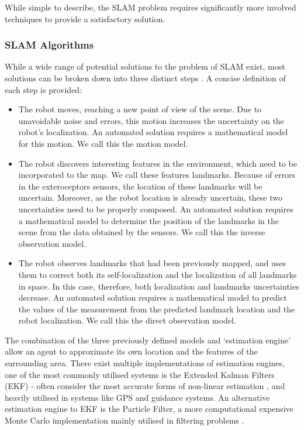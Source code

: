 While simple to describe, the SLAM problem requires significantly more
involved techniques to provide a satisfactory solution.

\subsubsection{SLAM Algorithms}
While a wide range of potential solutions to the problem of SLAM exist, most
solutions can be broken down into three distinct steps \cite{Sola2013}. 
A concise definition of each step is provided:

\begin{itemize}
\item The robot moves, reaching a new point of view of the scene. 
Due to unavoidable noise and errors, this motion increases the uncertainty on
the robot’s localization.
An automated solution requires a mathematical model for this motion. We call
this the motion model.

\item The robot discovers interesting features in the environment, which need
to be incorporated to the map. 
We call these features landmarks. 
Because of errors in the exteroceptors sensors, the location of these
landmarks will be uncertain.
Moreover, as the robot location is already uncertain, these two uncertainties
need to be properly composed. 
An automated solution requires a mathematical model to determine the position
of the landmarks in the scene from the data obtained by the sensors. 
We call this the inverse observation model.

\item The robot observes landmarks that had been previously mapped, and uses
them to correct both its self-localization and the localization of all
landmarks in space.
In this case, therefore, both localization and landmarks uncertainties
decrease.  
An automated solution requires a mathematical model to predict the
values of the measurement from the predicted landmark location and the robot
localization. 
We call this the direct observation model.
\end{itemize}

The combination of the three previously defined models and `estimation engine'
\cite{Sola2013} allow an agent to approximate its own location and the features
of the surrounding  area.
There exist multiple implementations of estimation engines, one of the most
commonly utilised systems is the Extended Kalman Filters (EKF) \cite{4378854}
- often consider the most accurate forms of non-linear estimation
  \cite{1271397}, and heavily utilised in systems like GPS and guidance
  systems.
An alternative estimation engine to EKF is the Particle Filter, a more
computational expensive Monte Carlo implementation mainly utilised in
filtering problems \cite{Bugallo2007}.

